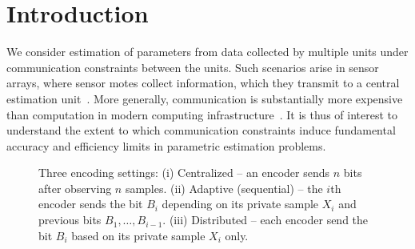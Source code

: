 
\section{Introduction}
\label{sec:Intro}

We consider estimation of parameters from data collected by multiple units
under communication constraints between the units.  Such scenarios arise in
sensor arrays, where sensor motes collect information, which they transmit
to a central estimation unit~\cite{LesserOrTa03,LiWoHuSa02}. More generally,
communication is substantially more expensive than computation in modern
computing infrastructure~\cite{FullerMi11}.  It is thus of interest to
understand the extent to which communication constraints induce fundamental
accuracy and efficiency limits in parametric estimation problems.
\begin{figure*}
  
  \caption{\label{fig:setup} Three encoding settings: (i) Centralized -- an
    encoder sends $n$ bits after observing $n$ samples. (ii) Adaptive
    (sequential) -- the $i$th encoder sends the bit $B_i$ depending on its
    private sample $X_i$ and previous bits $B_1,\ldots,B_{i-1}$. (iii)
    Distributed -- each encoder send the bit $B_i$ based on its private
    sample $X_i$ only.}
\end{figure*}

